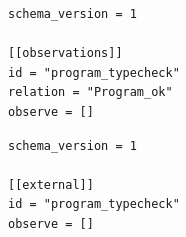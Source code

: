\begin{minipage}[b]{0.485\linewidth}
\begin{lstlisting}[style=configexample]
schema_version = 1

[[observations]]
id = "program_typecheck"
relation = "Program_ok"
observe = []
\end{lstlisting}
\end{minipage}\hfill
\begin{minipage}[b]{0.485\linewidth}
\begin{lstlisting}[style=configexample]
schema_version = 1

[[external]]
id = "program_typecheck"
observe = []
\end{lstlisting}
\end{minipage}
